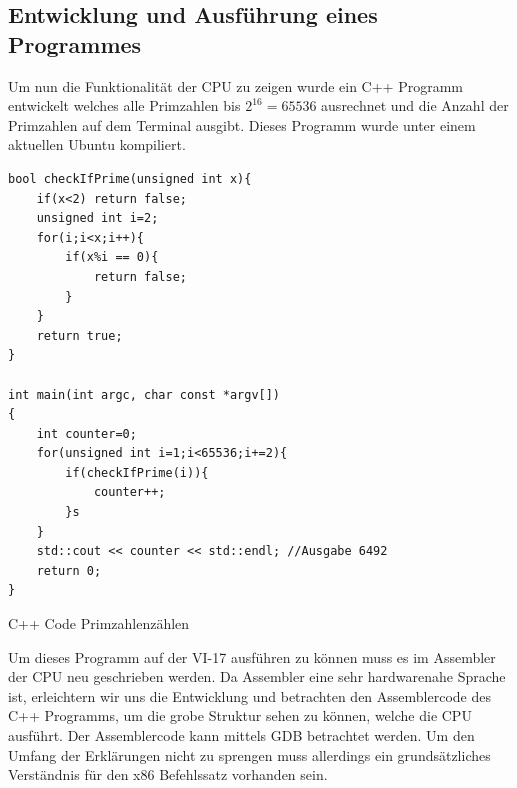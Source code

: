 \documentclass[12pt]{article}
\begin{document}
\newpage
\subsection{Entwicklung und Ausführung eines Programmes}


Um nun die Funktionalität der CPU zu zeigen wurde ein C++ Programm entwickelt welches alle Primzahlen bis $2^{16} = 65536$ ausrechnet und die Anzahl der Primzahlen auf dem Terminal ausgibt. Dieses Programm wurde unter einem aktuellen Ubuntu kompiliert.

\begin{code}[!htb]
\begin{lstlisting}
bool checkIfPrime(unsigned int x){
	if(x<2) return false;
	unsigned int i=2;
	for(i;i<x;i++){
		if(x%i == 0){
			return false;
		}
	}
	return true;
}

int main(int argc, char const *argv[])
{
	int counter=0;
	for(unsigned int i=1;i<65536;i+=2){
		if(checkIfPrime(i)){
			counter++;
		}s
	}
	std::cout << counter << std::endl; //Ausgabe 6492
	return 0;
}
\end{lstlisting}
\caption[C++ Code Primzahlenzählen]{C++ Code Primzahlenzählen}
\end{code}



Um dieses Programm auf der VI-17 ausführen zu können muss es im Assembler der CPU neu geschrieben werden. Da Assembler eine sehr hardwarenahe Sprache ist, erleichtern wir uns die Entwicklung und betrachten den Assemblercode des C++ Programms, um die grobe Struktur sehen zu können, welche die CPU ausführt. Der Assemblercode kann mittels GDB betrachtet werden. Um den Umfang der Erklärungen nicht zu sprengen muss allerdings ein grundsätzliches Verständnis für den x86 Befehlssatz vorhanden sein.
\newpage
\end{document}
